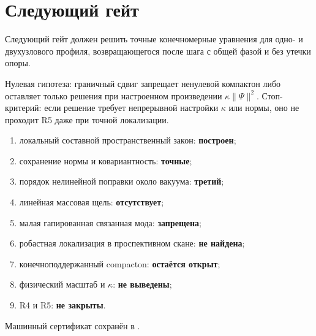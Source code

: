 \section{Следующий гейт}

Следующий гейт
должен решить точные конечномерные уравнения для одно- и двухузлового
профиля, возвращающегося после шага с общей фазой и без утечки опоры.

Нулевая гипотеза: граничный сдвиг запрещает ненулевой компактон либо
оставляет только решения при настроенном произведении $\kappa\|\Psi\|^2$.
Стоп-критерий: если решение требует непрерывной настройки $\kappa$ или
нормы, оно не проходит R5 даже при точной локализации.

\begin{protocol}
\begin{enumerate}
 \item локальный составной пространственный закон: \textbf{построен};
 \item сохранение нормы и ковариантность: \textbf{точные};
 \item порядок нелинейной поправки около вакуума: \textbf{третий};
 \item линейная массовая щель: \textbf{отсутствует};
 \item малая гапированная связанная мода: \textbf{запрещена};
 \item робастная локализация в проспективном скане: \textbf{не найдена};
 \item конечноподдержанный compacton: \textbf{остаётся открыт};
 \item физический масштаб и $\kappa$: \textbf{не выведены};
 \item R4 и R5: \textbf{не закрыты}.
\end{enumerate}
\end{protocol}

Машинный сертификат сохранён в
.